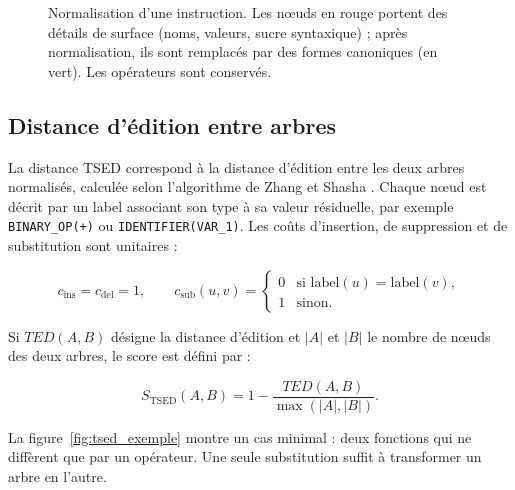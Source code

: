 {\begin{figure}[H]
{%
}
\caption{Normalisation d'une instruction. Les nœuds en rouge portent des
détails de surface (noms, valeurs, sucre syntaxique) ; après normalisation,
ils sont remplacés par des formes canoniques (en vert). Les opérateurs sont
conservés.}
\label{fig:normalisation_ast}
\end{figure}

\subsection{Distance d'édition entre arbres}

La distance TSED correspond à la distance d'édition entre les deux arbres
normalisés, calculée selon l'algorithme de Zhang et Shasha
\cite{zhang_simple_1989,song_revisiting_2024}. Chaque nœud est décrit par un
label associant son type à sa valeur résiduelle, par exemple
\texttt{BINARY\_OP(+)} ou \texttt{IDENTIFIER(VAR\_1)}. Les coûts
d'insertion, de suppression et de substitution sont unitaires :

\begin{equation}
c_{\mathrm{ins}} = c_{\mathrm{del}} = 1,
\qquad
c_{\mathrm{sub}}(u,v) =
\begin{cases}
0 & \text{si } \mathrm{label}(u) = \mathrm{label}(v),\\
1 & \text{sinon.}
\end{cases}
\end{equation}

Si $TED(A,B)$ désigne la distance d'édition et $|A|$ et $|B|$ le nombre de
nœuds des deux arbres, le score est défini par :

\begin{equation}
S_{\mathrm{TSED}}(A,B) =
1 - \frac{TED(A,B)}{\max\left(|A|,|B|\right)}.
\end{equation}

La figure~\ref{fig:tsed_exemple} montre un cas minimal : deux fonctions qui
ne diffèrent que par un opérateur. Une seule substitution suffit à
transformer un arbre en l'autre.

}
